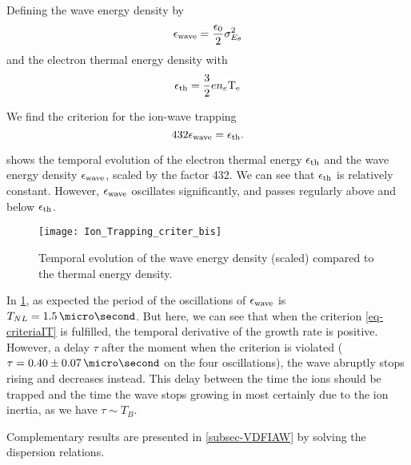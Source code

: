     Defining the wave energy  density by
    \begin{equation} \label{eq-waveE}
      \epsilon_{\rm wave} = \frac{\epsilon_0}{2} \sigma_{E_{\theta}}^2
    \end{equation}
    and the electron thermal energy density with
    \begin{equation} \label{eq-thE}
      \epsilon_{\rm th} = \frac{3}{2} e n_e \mathrm{T_e}
    \end{equation}
    
    We find the criterion for the ion-wave trapping
    \begin{equation} \label{eq-criteriaIT}
      432 \epsilon_{\rm wave} = \epsilon_{\rm th}.
    \end{equation}
    
     shows the temporal evolution of the electron thermal energy $\epsilon_{\rm th}$ and the wave energy density $\epsilon_{\rm wave}$, scaled by the factor 432.
    We can see that $\epsilon_{\rm th}$ is relatively constant.
    However, $\epsilon_{\rm wave}$  oscillates significantly, and passes regularly above and below $\epsilon_{\rm th}$.
    
    \begin{figure}[hbt]
      \centering
      \texttt{[image: Ion\_Trapping\_criter\_bis]}
      \caption{Temporal evolution of the wave energy density (scaled) compared to the thermal energy density.}
      \label{fig-tempITcrit}
    \end{figure}
    
    In \cref{fig-tempITcrit}, as expected the period of the oscillations of $\epsilon_{\rm wave}$ is $T_{NL} = 1.5\,\micro\second$.
    But here, we can see that when the criterion \cref{eq-criteriaIT} is fulfilled, the temporal derivative of the growth rate is positive.
    However, a delay $\tau$ after the moment when the criterion is violated ($\tau = 0.40 \pm 0.07 \,\micro\second$ on the four oscillations), the wave abruptly stops rising and decreases instead.
    This delay between the time the ions should be trapped and the time the wave stops growing in most certainly due to the ion inertia, as we have $\tau \sim T_B$.
    
    Complementary results are presented in \cref{subsec-VDFIAW} by solving the dispersion relations.
    
